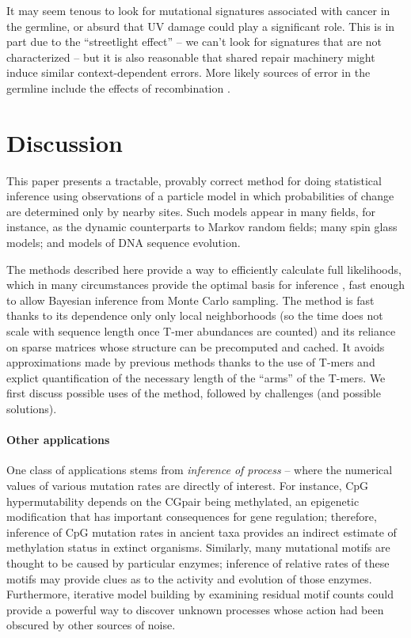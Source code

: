 \documentclass{article}
\newcommand{\nC}{\mbox{C}}
\newcommand{\nG}{\mbox{G}}
\theoremstyle{plain}
\theoremstyle{definition}
\begin{document}
It may seem tenous to look for mutational signatures associated with cancer in the germline,
or absurd that UV damage could play a significant role.
This is in part due to the ``streetlight effect'' --
we can't look for signatures that are not characterized --
but it is also reasonable that shared repair machinery might induce similar context-dependent errors.
More likely sources of error in the germline include the effects of recombination
\citep{arbeithuber2015crossovers,myers2010drive}.

\section{Discussion}

This paper presents a tractable, provably correct method
for doing statistical inference using observations of a particle model
in which probabilities of change are determined only by nearby sites.
Such models appear in many fields, for instance,
as the dynamic counterparts to Markov random fields;
many spin glass models;
and models of DNA sequence evolution.

The methods described here provide a way to efficiently calculate full likelihoods,
which in many circumstances provide the optimal basis for inference \citep{neyman1933problem},
fast enough to allow Bayesian inference from Monte Carlo sampling.
The method is fast thanks to its dependence only only local neighborhoods
(so the time does not scale with sequence length once T-mer abundances are counted)
and its reliance on sparse matrices whose structure can be precomputed and cached.
It avoids approximations made by previous methods thanks to the use of T-mers
and explict quantification of the necessary length of the ``arms'' of the T-mers.
We first discuss possible uses of the method,
followed by challenges (and possible solutions).

\paragraph{Other applications}
One class of applications stems from \emph{inference of process} --
where the numerical values of various mutation rates are directly of interest.
For instance, CpG hypermutability depends on the \nC\nG pair being methylated,
an epigenetic modification that has important consequences for gene regulation;
therefore, inference of CpG mutation rates in ancient taxa provides an indirect estimate
of methylation status in extinct organisms.
Similarly, many mutational motifs are thought to be caused by particular enzymes;
inference of relative rates of these motifs
may provide clues as to the activity and evolution of those enzymes.
Furthermore, iterative model building by examining residual motif counts
could provide a powerful way to discover unknown processes
whose action had been obscured by other sources of noise.
\end{document}
